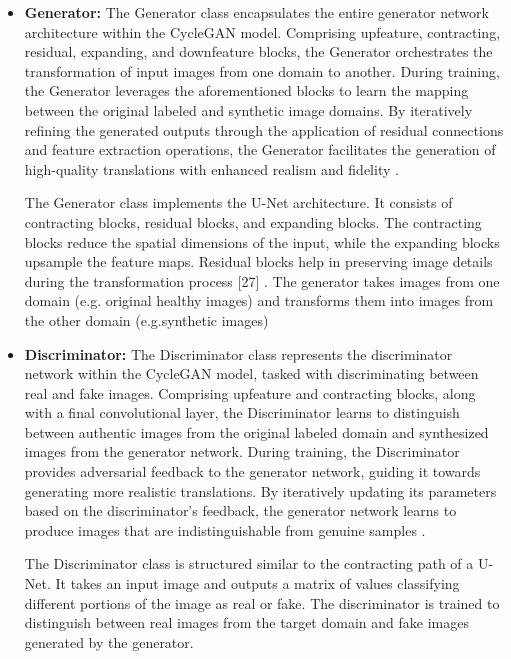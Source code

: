 \documentclass[UKenglish,12pt]{master-style}
\begin{document}
\begin{itemize}
\item \textbf{Generator:}
The Generator class encapsulates the entire generator network architecture within the CycleGAN model. Comprising upfeature, contracting, residual, expanding, and downfeature blocks, the Generator orchestrates the transformation of input images from one domain to another. During training, the Generator leverages the aforementioned blocks to learn the mapping between the original labeled and synthetic image domains. By iteratively refining the generated outputs through the application of residual connections and feature extraction operations, the Generator facilitates the generation of high-quality translations with enhanced realism and fidelity \cite{CycleGAN} .

The Generator class implements the U-Net architecture. It consists of contracting blocks, residual blocks, and expanding blocks. The contracting blocks reduce the spatial dimensions of the input, while the expanding blocks upsample the feature maps. Residual blocks help in preserving image details during the transformation process [27] . The generator takes images from one domain (e.g. original healthy images) and transforms them into images from the other domain (e.g.synthetic images)

\item \textbf{Discriminator:}
The Discriminator class represents the discriminator network within the CycleGAN model, tasked with discriminating between real and fake images. Comprising upfeature and contracting blocks, along with a final convolutional layer, the Discriminator learns to distinguish between authentic images from the original labeled domain and synthesized images from the generator network. During training, the Discriminator provides adversarial feedback to the generator network, guiding it towards generating more realistic translations. By iteratively updating its parameters based on the discriminator's feedback, the generator network learns to produce images that are indistinguishable from genuine samples \cite{CycleGAN} .

The Discriminator class is structured similar to the contracting path of a U-Net. It takes an input image and outputs a matrix of values classifying different portions of the image as real or fake. The discriminator is trained to distinguish between real images from the target domain and fake images generated by the
generator.
\end{itemize}
\end{document}
